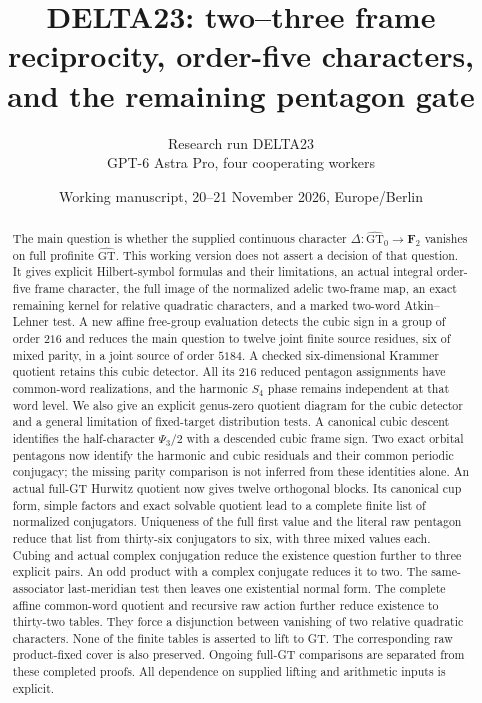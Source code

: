 \documentclass[11pt]{article}
\title{DELTA23: two--three frame reciprocity,\quad
  order-five characters, and the remaining pentagon gate}
\author{Research run DELTA23\\GPT-6 Astra Pro, four cooperating workers}
\date{Working manuscript, 20--21 November 2026, Europe/Berlin}
\newcommand{\GT}{\widehat{\mathrm{GT}}}
\newcommand{\GTz}{\widehat{\mathrm{GT}}_0}
\newcommand{\F}{\mathbf F}
\begin{document}
\maketitle
\begin{abstract}
The main question is whether the supplied continuous character
$\Delta:\GTz\to\F_2$ vanishes on full profinite $\GT$.
This working version does not assert a decision of that question.
It gives explicit Hilbert-symbol formulas and their limitations,
an actual integral order-five frame character, the full image of
the normalized adelic two-frame map, an exact remaining kernel
for relative quadratic characters, and a marked two-word
Atkin--Lehner test.  A new affine free-group evaluation detects
the cubic sign in a group of order $216$ and reduces the main
question to twelve joint finite source residues, six of mixed
parity, in a joint source of order $5184$. A checked six-dimensional
Krammer quotient retains this cubic detector. All its $216$
reduced pentagon assignments have common-word realizations, and
the harmonic $S_4$ phase remains independent at that word level.
We also give an explicit genus-zero quotient diagram for the
cubic detector and a general limitation of fixed-target
distribution tests. A canonical cubic descent identifies the
half-character $\Psi_3/2$ with a descended cubic frame sign.
Two exact orbital pentagons now identify the harmonic and cubic
residuals and their common periodic conjugacy; the missing parity
comparison is not inferred from these identities alone.
An actual full-GT Hurwitz quotient now gives twelve orthogonal
blocks. Its canonical cup form, simple factors and exact solvable
quotient lead to a complete finite list of normalized conjugators.
Uniqueness of the full first value and the literal raw pentagon
reduce that list from thirty-six conjugators to six, with three
mixed values each. Cubing and actual complex conjugation reduce
the existence question further to three explicit pairs. An odd product
with a complex conjugate reduces it to two. The same-associator
last-meridian test then leaves one existential normal form.
The complete affine common-word quotient and recursive raw action
further reduce existence to thirty-two tables. They force a disjunction
between vanishing of two relative quadratic characters. None of the
finite tables is asserted to lift to GT.
The corresponding raw product-fixed cover is also preserved.
Ongoing full-GT comparisons are separated
from these completed proofs. All dependence on supplied
lifting and arithmetic inputs is explicit.
\end{abstract}
\tableofcontents
\end{document}
